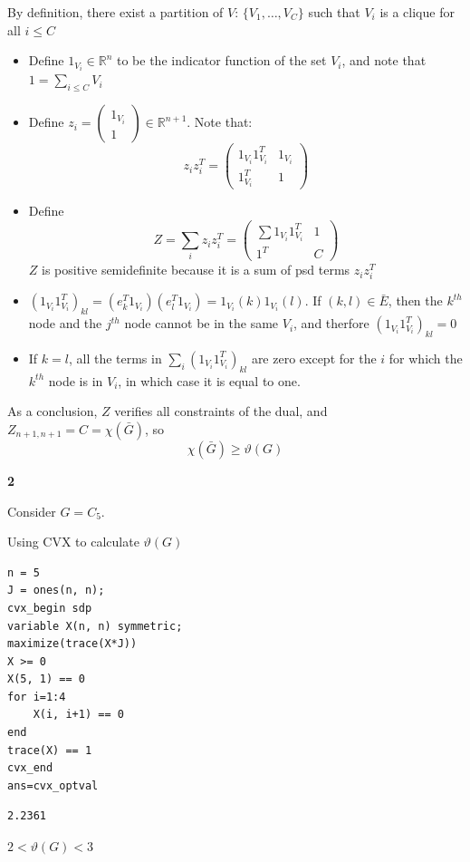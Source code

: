\documentclass[11pt]{article}
\begin{document}
By definition, there exist a partition of \(V\): \(\{V_1, \ldots, V_C\}\) such that \(V_i\) is a clique for all \(i \le C\)
\begin{itemize}
\item Define \(1_{V_i} \in \mathbb R^n\) to be the indicator function of the set \(V_i\), and note that \(1 = \sum_{i \le C} V_i\)
\item Define \(z_i = \begin{pmatrix}1_{V_i}\\1\end{pmatrix} \in \mathbb R^{n+1}\). Note that:
$$z_iz_i^T = \begin{pmatrix}1_{V_i}1_{V_i}^T&1_{V_i}\\1^T_{V_i}&1\end{pmatrix}$$
\item Define $$Z = \sum_{i} z_iz_i^T = \begin{pmatrix}\sum 1_{V_i}1_{V_i}^T&1\\1^T&C\end{pmatrix}$$
\(Z\) is positive semidefinite because it is a sum of psd terms \(z_iz_i^T\)
\item \((1_{V_i}1_{V_i}^T)_{kl} = (e_k^T1_{V_i})(e_l^T1_{V_i}) = 1_{V_i}(k) 1_{V_i}(l)\). If \((k, l) \in \bar E\), then the \(k^{th}\) node and the \(j^{th}\) node cannot be in the same \(V_i\), and therfore \((1_{V_i}1_{V_i}^T)_{kl} = 0\)
\item If \(k = l\), all the terms in \(\sum_i (1_{V_i}1_{V_i}^T)_{kl}\) are zero except for the \(i\) for which the \(k^{th}\) node is in \(V_i\), in which case it is equal to one.
\end{itemize}

As a conclusion, \(Z\) verifies all constraints of the dual, and \(Z_{n+1, n+1} = C = \chi(\bar G)\), so $$\chi(\bar G) \ge \vartheta(G)$$


\textbf{2}

Consider \(G = C_5\).

Using CVX to calculate \(\vartheta(G)\)
\begin{verbatim}
n = 5
J = ones(n, n);
cvx_begin sdp
variable X(n, n) symmetric;
maximize(trace(X*J))
X >= 0
X(5, 1) == 0
for i=1:4
    X(i, i+1) == 0
end
trace(X) == 1
cvx_end
ans=cvx_optval
\end{verbatim}

\begin{verbatim}
2.2361
\end{verbatim}


\(2 < \vartheta(G) < 3\)
\end{document}
